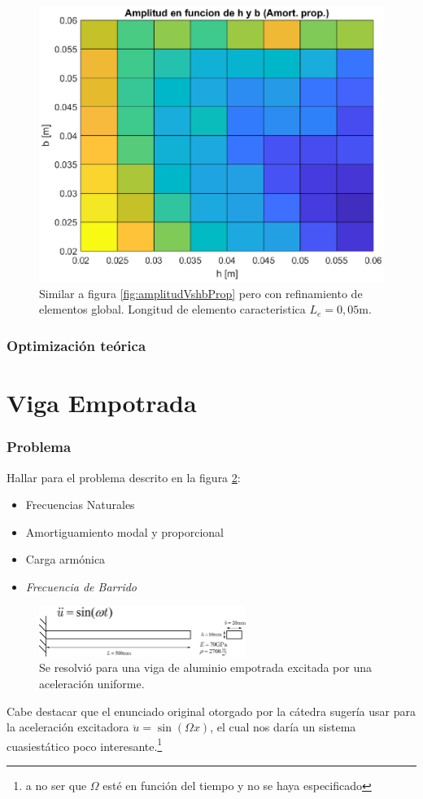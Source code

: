 \documentclass[onecolumn,10pt,titlepage,a4paper]{article}
\begin{document}
\begin{figure}
	\centering
			\includegraphics[width=0.7\linewidth]{fig/amplitudVshbPropRefinado.eps}
	\caption{Similar a figura \ref{fig:amplitudVshbProp} pero con refinamiento de elementos global. Longitud de elemento caracteristica $L_e=0,05$m.}
	\label{fig:amplitudVshbPropref}
\end{figure}

\section{Optimización teórica}


\clearpage
\part{Viga Empotrada}

\setcounter{section}{0}
\section{Problema}
Hallar para el problema descrito en la figura \ref{fig:enunciado}:
\begin{itemize}
	\item Frecuencias Naturales
	\item Amortiguamiento modal y proporcional
	\item Carga armónica
	\item \textit{Frecuencia de Barrido}
\end{itemize}

\begin{figure}[htb!]
	\centering
	\includegraphics[width=0.6\textwidth]{fig/enunciado.eps}
	\caption{Se resolvió para una viga de aluminio empotrada excitada por una aceleración uniforme.}\label{fig:enunciado}
\end{figure}
Cabe destacar que el enunciado original otorgado por la cátedra sugería usar para la aceleración excitadora $\ddot{u}=\sin (\Omega x)$, el cual nos daría un sistema cuasiestático poco interesante.\footnote{a no ser que $\Omega$ esté en función del tiempo y no se haya especificado}
\end{document}
